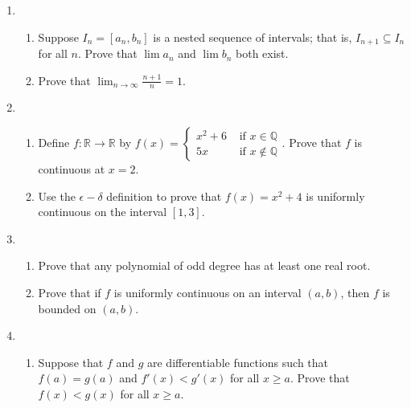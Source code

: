\documentclass[12pt]{article}
\newcommand{\points}[1]{\marginpar{\hspace{24pt}[#1]}}
\newcommand{\R}{\mathbb{R}}
\newcommand{\Q}{\mathbb{Q}}
\begin{document}
\begin{enumerate}
\newpage
\item\begin{enumerate}
\item Suppose $I_n = [a_n,b_n]$ is a nested sequence of intervals; that is, $I_{n+1}\subseteq I_n$ for all $n$. Prove that $\lim a_n$ and $\lim b_n$ both exist. \points{4}

\vspace{3in}

\item Prove that $\displaystyle \lim_{n\to \infty} \frac{n+1}{n} = 1$. \points{6}
\end{enumerate}
\newpage

\item \begin{enumerate}
       \item Define $f:\R\to\R$ by $\displaystyle f(x) = \begin{cases} x^2 + 6 & \text{ if } x\in \Q\\ 5x & \text{ if } x\notin \Q\end{cases}$. Prove that $f$ is continuous at $x=2$. \points{5}

\vspace{4in}

       \item Use the $\epsilon-\delta$ definition to prove that $f(x)=x^2+4$ is uniformly continuous on the interval $[1,3]$. \points{5}
      \end{enumerate}
\newpage

\item \begin{enumerate}
       \item Prove that any polynomial of odd degree has at least one real root. \points{6}

\vspace{4in}

       \item Prove that if $f$ is uniformly continuous on an interval $(a,b)$, then $f$ is bounded on $(a,b)$. \points{4}



      \end{enumerate}
\newpage
\item \begin{enumerate}
       \item Suppose that $f$ and $g$ are differentiable functions such that $f(a)=g(a)$ and $f'(x)< g'(x)$ for all $x\geq a$. Prove that $f(x)< g(x)$ for all $x\geq a$. \points{5}


\end{enumerate}
\end{enumerate}
\end{document}
